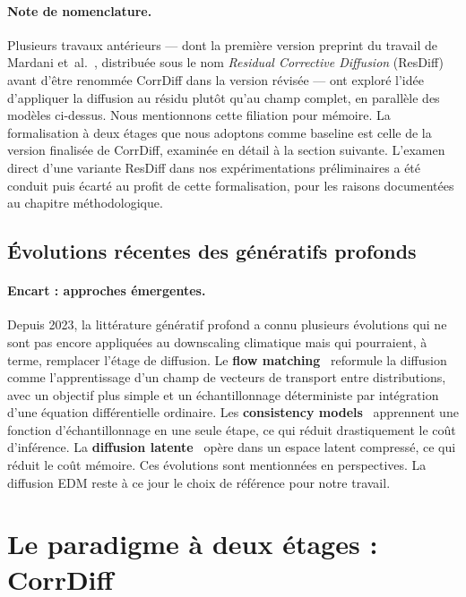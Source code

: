 \documentclass[14pt,a4paper,openany]{extreport}
\theoremstyle{definition}
\begin{document}
\paragraph{Note de nomenclature.}
Plusieurs travaux antérieurs --- dont la première version preprint du travail de Mardani et~al.~\cite{mardani_corrdiff_2023}, distribuée sous le nom \emph{Residual Corrective Diffusion} (ResDiff) avant d'être renommée CorrDiff dans la version révisée --- ont exploré l'idée d'appliquer la diffusion au résidu plutôt qu'au champ complet, en parallèle des modèles ci-dessus. Nous mentionnons cette filiation pour mémoire. La formalisation à deux étages que nous adoptons comme baseline est celle de la version finalisée de CorrDiff, examinée en détail à la section suivante. L'examen direct d'une variante ResDiff dans nos expérimentations préliminaires a été conduit puis écarté au profit de cette formalisation, pour les raisons documentées au chapitre méthodologique.

\subsection{Évolutions récentes des génératifs profonds}
\label{ssec:soa-flow-matching}

\paragraph{Encart : approches émergentes.}
Depuis 2023, la littérature génératif profond a connu plusieurs évolutions qui ne sont pas encore appliquées au downscaling climatique mais qui pourraient, à terme, remplacer l'étage de diffusion. Le \textbf{flow matching}~\cite{lipman_flow_2023} reformule la diffusion comme l'apprentissage d'un champ de vecteurs de transport entre distributions, avec un objectif plus simple et un échantillonnage déterministe par intégration d'une équation différentielle ordinaire. Les \textbf{consistency models}~\cite{song_consistency_2023} apprennent une fonction d'échantillonnage en une seule étape, ce qui réduit drastiquement le coût d'inférence. La \textbf{diffusion latente}~\cite{rombach_latent_2022} opère dans un espace latent compressé, ce qui réduit le coût mémoire. Ces évolutions sont mentionnées en perspectives. La diffusion EDM reste à ce jour le choix de référence pour notre travail.

\section{Le paradigme à deux étages : CorrDiff}
\label{sec:soa-corrdiff}
\end{document}
